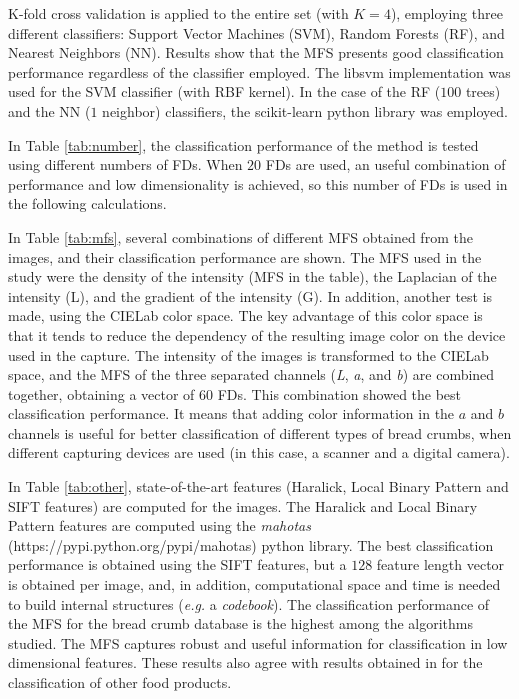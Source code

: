 \documentclass[a4paper,10pt]{article}
\begin{document}
K-fold cross validation is applied to the entire set (with $K=4$), employing three different classifiers: Support Vector Machines (SVM), Random Forests (RF), and Nearest Neighbors (NN). Results show that the MFS presents good classification performance regardless of the classifier employed. The \textsf{libsvm} implementation \cite{Chang2011} was used for the SVM classifier (with RBF kernel). In the case of the RF ($100$ trees) and the NN ($1$ neighbor) classifiers, the \textsf{scikit-learn} python library was employed.

In Table \ref{tab:number}, the classification performance of the method is tested using different numbers of FDs. When $20$ FDs are used, an useful combination of performance and low dimensionality is achieved, so this number of FDs is used in the following calculations.

In Table \ref{tab:mfs}, several combinations of different MFS obtained from the images, and their classification performance are shown. The MFS used in the study were the density of the intensity (MFS in the table), the Laplacian of the intensity (L), and the gradient of the intensity (G). In addition, another test is made, using the CIELab color space. The key advantage of this color space is that it tends to reduce the dependency of the resulting image color on the device used in the capture. The intensity of the images is transformed to the CIELab space, and the MFS of the three separated channels ({\em L}, {\em a}, and {\em b}) are combined together, obtaining a vector of $60$ FDs. This combination showed the best classification performance. It means that adding color information in the $a$ and $b$ channels is useful for better classification of different types of bread crumbs, when different capturing devices are used (in this case, a scanner and a digital camera).

In Table \ref{tab:other}, state-of-the-art features (Haralick, Local Binary Pattern and SIFT features) are computed for the images. The Haralick and Local Binary Pattern features are computed using the {\em mahotas} (\textsf{https://pypi.python.org/pypi/mahotas}) python library. The best classification performance is obtained using the SIFT features, but a $128$ feature length vector is obtained per image, and, in addition, computational space and time is needed to build internal structures ({\em e.g.} a {\em codebook}). The classification performance of the MFS for the bread crumb database is the highest among the algorithms studied. The MFS captures robust and useful information for classification in low dimensional features. These results also agree with results obtained in \cite{Bosch2011} for the classification of other food products.
\end{document}
